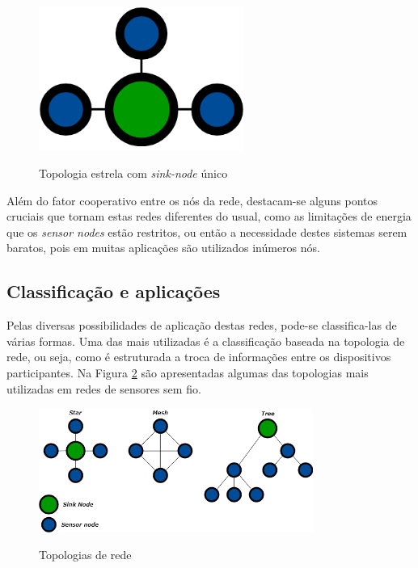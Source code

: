 \documentclass[oneside,openright,12pt]{ufsm_2015} %
\begin{document}
\begin{figure}[ht]
 	    \caption{\label{exepretex} Topologia estrela com \textit{sink-node} único}
    \centering
    \includegraphics[width=0.6\textwidth]{figuras/star_topology.png}
    \vspace{\baselineskip} %
        \label{fig:star-topology}
\end{figure}

Além do fator cooperativo entre os nós da rede, destacam-se alguns pontos cruciais que tornam estas redes diferentes do usual, como as limitações de energia que os \textit{sensor nodes} estão restritos, ou então a necessidade destes sistemas serem baratos, pois em muitas aplicações são utilizados inúmeros nós.

\subsection{Classificação e aplicações}
Pelas diversas possibilidades de aplicação destas redes, pode-se classifica-las de várias formas. Uma das mais utilizadas é a classificação baseada na topologia de rede, ou seja, como é estruturada a troca de informações entre os dispositivos participantes. Na Figura \ref{fig:topologias} são apresentadas algumas das topologias mais utilizadas em redes de sensores sem fio. 

\begin{figure}[ht]
 	    \caption{\label{exepretex} Topologias de rede}
    \centering
    \includegraphics[width=0.8\textwidth]{figuras/toplogias.png}
    \vspace{\baselineskip} %
        \label{fig:topologias}
\end{figure}
\end{document}
